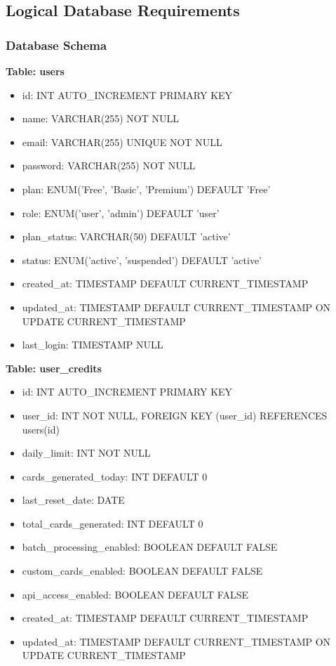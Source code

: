\documentclass[12pt,a4paper]{article}
\begin{document}
\subsection{Logical Database Requirements}

\subsubsection{Database Schema}

\textbf{Table: users}
\begin{itemize}
    \item id: INT AUTO\_INCREMENT PRIMARY KEY
    \item name: VARCHAR(255) NOT NULL
    \item email: VARCHAR(255) UNIQUE NOT NULL
    \item password: VARCHAR(255) NOT NULL
    \item plan: ENUM('Free', 'Basic', 'Premium') DEFAULT 'Free'
    \item role: ENUM('user', 'admin') DEFAULT 'user'
    \item plan\_status: VARCHAR(50) DEFAULT 'active'
    \item status: ENUM('active', 'suspended') DEFAULT 'active'
    \item created\_at: TIMESTAMP DEFAULT CURRENT\_TIMESTAMP
    \item updated\_at: TIMESTAMP DEFAULT CURRENT\_TIMESTAMP ON UPDATE CURRENT\_TIMESTAMP
    \item last\_login: TIMESTAMP NULL
\end{itemize}

\textbf{Table: user\_credits}
\begin{itemize}
    \item id: INT AUTO\_INCREMENT PRIMARY KEY
    \item user\_id: INT NOT NULL, FOREIGN KEY (user\_id) REFERENCES users(id)
    \item daily\_limit: INT NOT NULL
    \item cards\_generated\_today: INT DEFAULT 0
    \item last\_reset\_date: DATE
    \item total\_cards\_generated: INT DEFAULT 0
    \item batch\_processing\_enabled: BOOLEAN DEFAULT FALSE
    \item custom\_cards\_enabled: BOOLEAN DEFAULT FALSE
    \item api\_access\_enabled: BOOLEAN DEFAULT FALSE
    \item created\_at: TIMESTAMP DEFAULT CURRENT\_TIMESTAMP
    \item updated\_at: TIMESTAMP DEFAULT CURRENT\_TIMESTAMP ON UPDATE CURRENT\_TIMESTAMP
\end{itemize}
\end{document}
